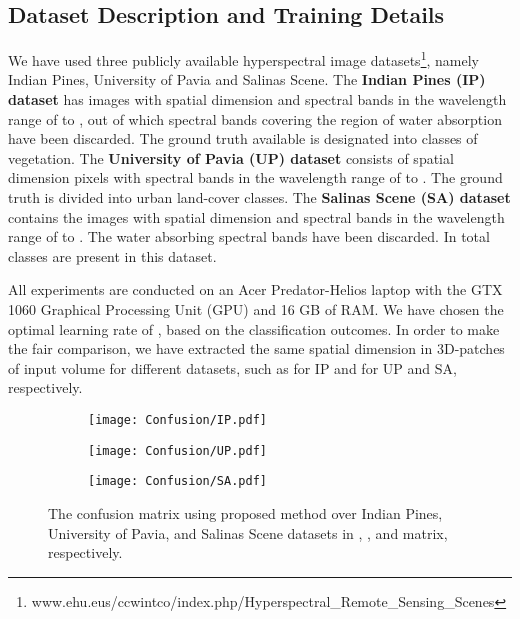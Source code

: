 \documentclass[journal]{IEEEtran}
\begin{document}
\subsection{Dataset Description and Training Details}
We have used three publicly available hyperspectral image datasets\footnote{www.ehu.eus/ccwintco/index.php/Hyperspectral\_Remote\_Sensing\_Scenes}, namely Indian Pines, University of Pavia and Salinas Scene. The \textbf{Indian Pines (IP) dataset} has images with  spatial dimension and  spectral bands in the wavelength range of  to  , out of which  spectral bands covering the region of water absorption have been discarded. The ground truth available is designated into  classes of vegetation. The \textbf{University of Pavia (UP) dataset} consists of  spatial dimension pixels with  spectral bands in the wavelength range of  to . The ground truth is divided into  urban land-cover classes. The \textbf{Salinas Scene (SA) dataset} contains the images with  spatial dimension and  spectral bands in the wavelength range of  to . The  water absorbing spectral bands have been discarded. In total  classes are present in this dataset.

All experiments are conducted on an Acer Predator-Helios laptop with the GTX 1060 Graphical Processing Unit (GPU) and 16 GB of RAM. We have chosen the optimal learning rate of , based on the classification outcomes. In order to make the fair comparison, we have extracted the same spatial dimension in 3D-patches of input volume for different datasets, such as  for IP and  for UP and SA, respectively.

\begin{figure}[!t]
\centering
\begin{subfigure}{0.32\columnwidth}
\centering
\texttt{[image: Confusion/IP.pdf]}\end{subfigure}\begin{subfigure}{0.32\columnwidth}
\centering
\texttt{[image: Confusion/UP.pdf]}\end{subfigure}
\begin{subfigure}{0.32\columnwidth}
\centering
\texttt{[image: Confusion/SA.pdf]}\end{subfigure}\caption{The confusion matrix using proposed method over Indian Pines, University of Pavia, and Salinas Scene datasets in , , and  matrix, respectively.}
\label{fig:conf_mat}
\end{figure}
\end{document}
